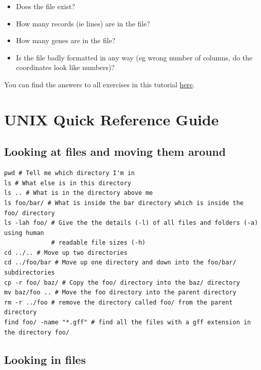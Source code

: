 \documentclass[11pt]{article}
\providecommand{\tightlist}{%
      \setlength{\itemsep}{0pt}\setlength{\parskip}{0pt}}
\begin{document}
\begin{itemize}
\tightlist
\item
  Does the file exist?
\item
  How many records (ie lines) are in the file?
\item
  How many genes are in the file?
\item
  Is the file badly formatted in any way (eg wrong number of columns, do
  the coordinates look like numbers)?
\end{itemize}

You can find the answers to all exercises in this tutorial
\href{answers.ipynb}{here}.





\newpage





    \hypertarget{unix-quick-reference-guide}{%
\section{UNIX Quick Reference Guide}\label{unix-quick-reference-guide}}

\hypertarget{looking-at-files-and-moving-them-around}{%
\subsection{Looking at files and moving them
around}\label{looking-at-files-and-moving-them-around}}

\begin{verbatim}
pwd # Tell me which directory I'm in
ls # What else is in this directory
ls .. # What is in the directory above me
ls foo/bar/ # What is inside the bar directory which is inside the foo/ directory
ls -lah foo/ # Give the the details (-l) of all files and folders (-a) using human
             # readable file sizes (-h)
cd ../.. # Move up two directories
cd ../foo/bar # Move up one directory and down into the foo/bar/ subdirectories
cp -r foo/ baz/ # Copy the foo/ directory into the baz/ directory
mv baz/foo .. # Move the foo directory into the parent directory
rm -r ../foo # remove the directory called foo/ from the parent directory
find foo/ -name "*.gff" # find all the files with a gff extension in the directory foo/
\end{verbatim}

\hypertarget{looking-in-files}{%
\subsection{Looking in files}\label{looking-in-files}}
\end{document}
